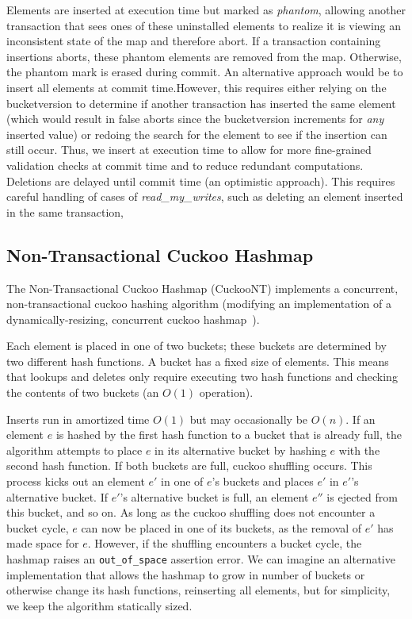 Elements are inserted at execution time but marked as \emph{phantom}, allowing another transaction that sees ones of these uninstalled elements to realize it is viewing an inconsistent state of the map and therefore abort. If a transaction containing insertions aborts, these phantom elements are removed from the map. Otherwise, the phantom mark is erased during commit. An alternative approach would be to insert all elements at commit time.However, this requires either relying on the bucketversion to determine if another transaction has inserted the same element (which would result in false aborts since the bucketversion increments for \emph{any} inserted value) or redoing the search for the element to see if the insertion can still occur. Thus, we insert at execution time to allow for more fine-grained validation checks at commit time and to reduce redundant computations. Deletions are delayed until commit time (an optimistic approach). This requires careful handling of cases of \emph{read\_my\_writes}, such as deleting an element inserted in the same transaction, 

\subsection{Non-Transactional Cuckoo Hashmap}
The Non-Transactional Cuckoo Hashmap (CuckooNT) implements a concurrent, non-transactional cuckoo hashing algorithm (modifying an implementation of a dynamically-resizing, concurrent cuckoo hashmap~\cite{cuckoocode}).

Each element is placed in one of two buckets; these buckets are determined by two different hash functions. A bucket has a fixed size of elements. This means that lookups and deletes only require executing two hash functions and checking the contents of two buckets (an $O(1)$ operation).

Inserts run in amortized time $O(1)$ but may occasionally be $O(n)$.
If an element $e$ is hashed by the first hash function to a bucket that is already full, the algorithm attempts to place $e$ in its alternative bucket by hashing $e$ with the second hash function. If both buckets are full, cuckoo shuffling occurs. This process kicks out an element $e'$ in one of $e$'s buckets and places $e'$ in $e'$'s alternative bucket. If $e'$'s alternative bucket is full, an element $e''$ is ejected from this bucket, and so on. As long as the cuckoo shuffling does not encounter a bucket cycle, $e$ can now be placed in one of its buckets, as the removal of $e'$ has made space for $e$.
However, if the shuffling encounters a bucket cycle, the hashmap raises an \texttt{{out\_of\_space}} assertion error. We can imagine an alternative implementation that allows the hashmap to grow in number of buckets or otherwise change its hash functions, reinserting all elements, but for simplicity, we keep the algorithm statically sized.

